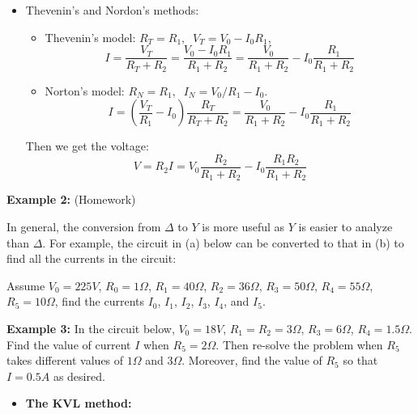 \begin{itemize}
\begin{itemize}
\item Thevenin's and Nordon's methods:
  \begin{itemize}
  \item Thevenin's model: $R_T=R_1,\;\;V_T=V_0-I_0R_1$,
    \[
    I=\frac{V_T}{R_T+R_2}=\frac{V_0-I_0R_1}{R_1+R_2}
    =\frac{V_0}{R_1+R_2}-I_0\frac{R_1}{R_1+R_2}
    \]
  \item Norton's model: $R_N=R_1,\;\;I_N=V_0/R_1-I_0$.
    \[
    I=\left(\frac{V_T}{R_1}-I_0\right)\frac{R_T}{R_T+R_2}
    =\frac{V_0}{R_1+R_2}-I_0\frac{R_1}{R_1+R_2}
    \]
  \end{itemize}
  Then we get the voltage:
  \[
  V=R_2 I=V_0\frac{R_2}{R_1+R_2}-I_0\frac{R_1R_2}{R_1+R_2}
  \]

\end{itemize}


{\bf Example 2:} (Homework)

In general, the conversion from $\Delta$ to $Y$ is more useful as $Y$ 
is easier to analyze than $\Delta$. For example, the circuit in (a) 
below can be converted to that in (b) to find all the currents in the 
circuit:


Assume $V_0=225 V$, $R_0=1\Omega$, $R_1=40\Omega$, $R_2=36\Omega$, 
$R_3=50\Omega$, $R_4=55\Omega$, $R_5=10\Omega$, find the currents 
$I_0$, $I_1$, $I_2$, $I_3$, $I_4$, and $I_5$. 

{\bf Example 3: } In the circuit below, $V_0=18V$, $R_1=R_2=3\Omega$, 
$R_3=6\Omega$, $R_4=1.5\Omega$. Find the value of current $I$ when 
$R_5=2\Omega$. Then re-solve the problem when $R_5$ takes different
values of $1\Omega$ and $3\Omega$. Moreover, find the value of $R_5$ 
so that $I=0.5A$ as desired.


\begin{itemize}
\item {\bf The KVL method:} 


\end{itemize}
\end{itemize}
